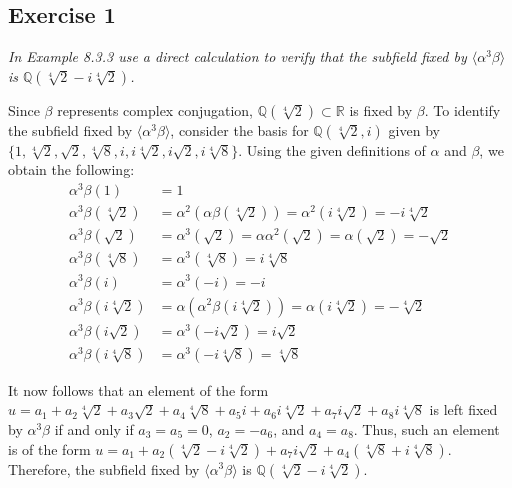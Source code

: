 \subsection*{Exercise 1}
\textit{In Example 8.3.3 use a direct calculation to verify that the subfield fixed by $\langle \alpha^3 \beta \rangle$ is $\mathbb{Q}(\sqrt[4]{2} - i\sqrt[4]{2})$.}

Since $\beta$ represents complex conjugation, $\mathbb{Q}(\sqrt[4]{2}) \subset \mathbb{R}$ is fixed by $\beta$. To identify the subfield fixed by $\langle \alpha^3 \beta \rangle$, consider the basis for $\mathbb{Q}(\sqrt[4]{2},i)$ given by $\{1,\sqrt[4]{2},\sqrt{2},\sqrt[4]{8},i,i\sqrt[4]{2},i\sqrt{2},i\sqrt[4]{8}\}$. Using the given definitions of $\alpha$ and $\beta$, we obtain the following:
\begin{align*}
    \alpha^3\beta(1) &= 1 \\
    \alpha^3\beta(\sqrt[4]{2}) &= \alpha^2(\alpha\beta(\sqrt[4]{2})) =  \alpha^2(i\sqrt[4]{2}) = -i\sqrt[4]{2} \\
    \alpha^3\beta(\sqrt{2}) &= \alpha^3(\sqrt{2}) = \alpha\alpha^2(\sqrt{2}) = \alpha(\sqrt{2}) = -\sqrt{2} \\
    \alpha^3\beta(\sqrt[4]{8}) &= \alpha^3(\sqrt[4]{8}) = i\sqrt[4]{8} \\
    \alpha^3\beta(i) &= \alpha^3(-i) = -i \\
    \alpha^3\beta(i\sqrt[4]{2}) &= \alpha(\alpha^2\beta(i\sqrt[4]{2})) = \alpha(i\sqrt[4]{2}) = -\sqrt[4]{2} \\
    \alpha^3\beta(i\sqrt{2}) &= \alpha^3(-i\sqrt{2}) = i\sqrt{2} \\
    \alpha^3\beta(i\sqrt[4]{8}) &= \alpha^3(-i\sqrt[4]{8}) = \sqrt[4]{8}
\end{align*}

It now follows that an element of the form $u = a_1 + a_2\sqrt[4]{2} + a_3\sqrt{2} + a_4\sqrt[4]{8} + a_5i + a_6i\sqrt[4]{2} + a_7i\sqrt{2} + a_8i\sqrt[4]{8}$ is left fixed by $\alpha^3\beta$ if and only if $a_3 = a_5 = 0$, $a_2 = -a_6$, and $a_4 = a_8$. Thus, such an element is of the form $u = a_1 + a_2(\sqrt[4]{2} - i\sqrt[4]{2}) + a_7i\sqrt{2} + a_4(\sqrt[4]{8} + i\sqrt[4]{8})$. Therefore, the subfield fixed by $\langle \alpha^3 \beta \rangle$ is $\mathbb{Q}(\sqrt[4]{2} - i\sqrt[4]{2})$.